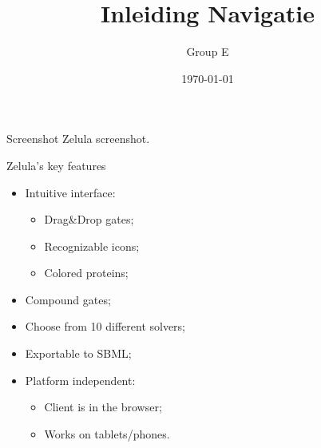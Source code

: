\documentclass[utf8x,outline]{beamer}
\title{Inleiding Navigatie}
\author{Group E}
\institute{TU Delft}
\date{\today}
\begin{document}
\begin{frame}{Screenshot Zelula}
	screenshot.
\end{frame}
\begin{frame}{Zelula's key features}
	\begin{itemize}
		\item Intuitive interface:
		\begin{itemize}
			\item Drag&Drop gates;
			\item Recognizable icons;
			\item Colored proteins;
		\end{itemize}
		\item Compound gates;
		\item Choose from 10 different solvers;
		\item Exportable to SBML;
		\item Platform independent:
		\begin{itemize}
			\item Client is in the browser;
			\item Works on tablets/phones.
		\end{itemize}
	\end{itemize}
\end{frame}
\end{document}
